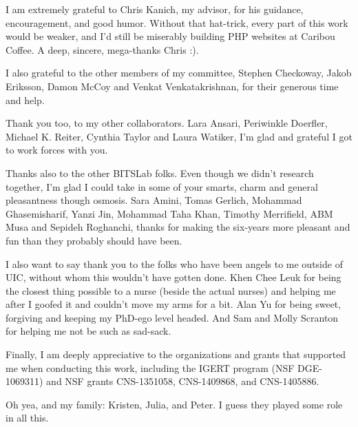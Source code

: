 \acknowledgment
I am extremely grateful to Chris Kanich, my advisor, for his guidance,
encouragement, and good humor.  Without that hat-trick, every part of this
work would be weaker, and I'd still be miserably building PHP websites
at Caribou Coffee.  A deep, sincere, mega-thanks Chris :).

I also grateful to the other members of my committee, Stephen Checkoway,
Jakob Eriksson, Damon McCoy and Venkat Venkatakrishnan, for their generous
time and help.

Thank you too, to my other collaborators. Lara Ansari,
Periwinkle Doerfler, Michael K. Reiter, Cynthia Taylor and Laura Watiker,
I'm glad and grateful I got to work forces with you.

Thanks also to the other BITSLab folks.  Even though we didn't research
together, I'm glad I could take in some of your smarts, charm and general
pleasantness though osmosis. Sara Amini, Tomas Gerlich, Mohammad Ghasemisharif,
Yanzi Jin, Mohammad Taha Khan, Timothy Merrifield, ABM Musa and Sepideh
Roghanchi, thanks for making the six-years more pleasant and fun than they
probably should have been.

I also want to say thank you to the folks who have been angels to me outside of
UIC, without whom this wouldn't have gotten done. Khen Chee Leuk for being the
closest thing possible to a nurse (beside the actual nurses) and helping me
after I goofed it and couldn't move my arms for a bit.  Alan Yu for being
sweet, forgiving and keeping my PhD-ego level headed.  And Sam and Molly
Scranton for helping me not be such as sad-sack.

Finally, I am deeply appreciative to the organizations and grants that
supported me when conducting this work, including the IGERT program (NSF
DGE-1069311) and NSF grants CNS-1351058, CNS-1409868, and CNS-1405886.

Oh yea, and my family: Kristen, Julia, and Peter.  I guess they played some
role in all this.
